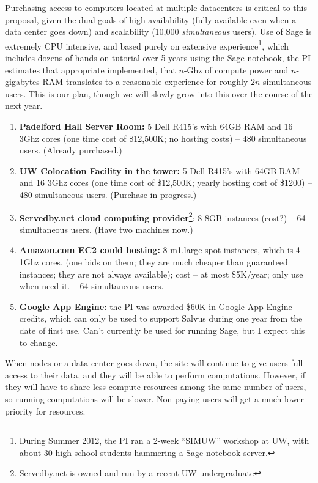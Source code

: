 \documentclass[11pt]{article}
\begin{document}
Purchasing access to computers located at multiple datacenters is
critical to this proposal, given the dual goals of high availability
(fully available even when a data center goes down) and scalability
(10,000 {\em simultaneous} users).  Use of Sage is extremely CPU
intensive, and based purely on extensive experience\footnote{During
  Summer 2012, the PI ran a 2-week ``SIMUW'' workshop at UW, with
  about 30 high school students hammering a Sage notebook server.},
which includes dozens of hands on tutorial over 5 years using the Sage
notebook, the PI estimates that appropriate implemented, that $n$-Ghz
of compute power and $n$-gigabytes RAM translates to a reasonable
experience for roughly $2n$ simultaneous users.  This is our plan,
though we will slowly grow into this over the course of the next year.

\begin{enumerate}
\item {\bf Padelford Hall Server Room:} 5 Dell R415's with 64GB RAM
  and 16 3Ghz cores (one time cost of \$12,500K; no hosting costs) --
  480 simultaneous users.   (Already purchased.)

\item {\bf UW Colocation Facility in the tower:} 5 Dell R415's with
  64GB RAM and 16 3Ghz cores (one time cost of \$12,500K; yearly
  hosting cost of \$1200) -- 480 simultaneous users.  (Purchase in progress.)

\item {\bf Servedby.net cloud computing
  provider}\footnote{Servedby.net is owned and run by a recent UW 
  undergraduate}: 8 8GB instances (cost?) -- 64 simultaneous users.
  (Have two machines now.)

\item {\bf Amazon.com EC2 could hosting:} 8 m1.large spot instances,
  which is 4 1Ghz cores. (one bids on them; they are much cheaper than
  guaranteed instances; they are not always available); cost -- at
  most \$5K/year; only use when need it. -- 64 simultaneous users.

\item {\bf Google App Engine:} the PI was awarded \$60K in Google App
  Engine credits, which can only be used to support Salvus during one
  year from the date of first use.  Can't currently be used for
  running Sage, but I expect this to change.
\end{enumerate}

When nodes or a data center goes down, the site will continue to give
users full access to their data, and they will be able to perform
computations.  However, if they will have to share less compute
resources among the same number of users, so running computations will
be slower.  Non-paying users will get a much lower priority for
resources.   
\end{document}
